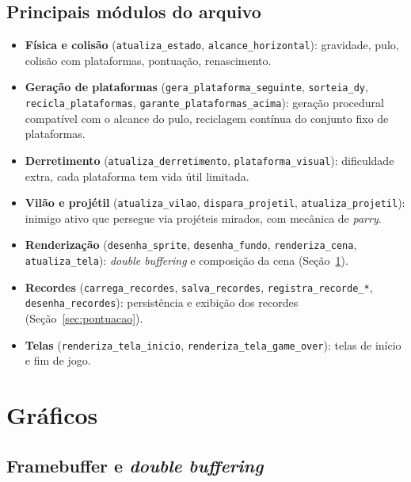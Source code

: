 \documentclass[a4paper,12pt]{article}
\newcommand{\code}[1]{\texttt{#1}}
\begin{document}
\subsection{Principais módulos do arquivo}

\begin{itemize}
    \item \textbf{Física e colisão} (\code{atualiza\_estado}, \code{alcance\_horizontal}):
    gravidade, pulo, colisão com plataformas, pontuação, renascimento.
    \item \textbf{Geração de plataformas} (\code{gera\_plataforma\_seguinte},
    \code{sorteia\_dy}, \code{recicla\_plataformas}, \code{garante\_plataformas\_acima}):
    geração procedural compatível com o alcance do pulo, reciclagem contínua
    do conjunto fixo de plataformas.
    \item \textbf{Derretimento} (\code{atualiza\_derretimento}, \code{plataforma\_visual}):
    dificuldade extra, cada plataforma tem vida útil limitada.
    \item \textbf{Vilão e projétil} (\code{atualiza\_vilao}, \code{dispara\_projetil},
    \code{atualiza\_projetil}): inimigo ativo que persegue via projéteis
    mirados, com mecânica de \emph{parry}.
    \item \textbf{Renderização} (\code{desenha\_sprite}, \code{desenha\_fundo},
    \code{renderiza\_cena}, \code{atualiza\_tela}): \emph{double buffering} e
    composição da cena (Seção~\ref{sec:graficos}).
    \item \textbf{Recordes} (\code{carrega\_recordes}, \code{salva\_recordes},
    \code{registra\_recorde\_*}, \code{desenha\_recordes}): persistência e
    exibição dos recordes (Seção~\ref{sec:pontuacao}).
    \item \textbf{Telas} (\code{renderiza\_tela\_inicio}, \code{renderiza\_tela\_game\_over}):
    telas de início e fim de jogo.
\end{itemize}

\section{Gráficos}
\label{sec:graficos}

\subsection{Framebuffer e \emph{double buffering}}
\end{document}
